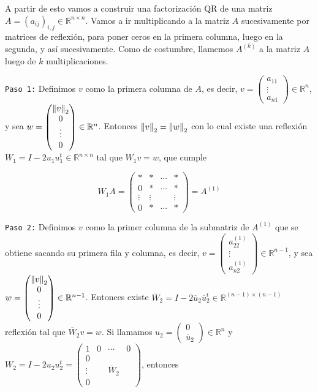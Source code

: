 A partir de esto vamos a construir una factorización QR de una matriz $A = (a_{ij})_{i, j} \in \mathbb{R}^{n \times n}$. Vamos a ir multiplicando a la matriz $A$ sucesivamente por matrices de reflexión, para poner ceros en la primera columna, luego en la segunda, y así sucesivamente. Como de costumbre, llamemos $A^{(k)}$ a la matriz $A$ luego de $k$ multiplicaciones.


\texttt{Paso 1:} Definimos $v$ como la primera columna de $A$, es decir, $v = \begin{pmatrix} a_{11} \\ \vdots \\ a_{n1} \end{pmatrix} \in \mathbb{R}^{n}$, y sea $w = \begin{pmatrix}\left\lVert v\right\rVert_2 \\ 0 \\ \vdots \\ 0 \end{pmatrix} \in \mathbb{R}^{n}$. Entonces $\left\lVert v\right\rVert_2 = \left\lVert w\right\rVert_2$ con lo cual existe una reflexión $W_1 = I - 2u_1u_1^t \in \mathbb{R}^{n \times n}$ tal que $W_1v = w$, que cumple

\[W_1 A = \begin{pmatrix}
* & * & \cdots & *\\
0 & * & \cdots & *\\
\vdots & \vdots & & \vdots \\
0 & * & \cdots & *
\end{pmatrix} = A^{(1)}\]

\texttt{Paso 2:} Definimos $v$ como la primer columna de la submatriz de $A^{(1)}$ que se obtiene sacando su primera fila y columna, es decir, $v = \begin{pmatrix}a^{(1)}_{22} \\ \vdots \\ a^{(1)}_{n2} \end{pmatrix} \in \mathbb{R}^{n - 1}$, y sea $w = \begin{pmatrix}\left\lVert v\right\rVert_2 \\ 0 \\ \vdots \\ 0 \end{pmatrix} \in \mathbb{R}^{n - 1}$. Entonces existe $\overline{W}_2 = I - 2\overline{u}_2\overline{u}_2^t \in \mathbb{R}^{(n - 1) \times (n - 1)}$ reflexión tal que $\overline{W}_2v = w$. Si llamamos $u_2 = \begin{pmatrix}0 \\ \overline{u}_2\end{pmatrix} \in \mathbb{R}^n$ y $W_2 = I - 2u_2u_2^t = \begin{pmatrix}1 & 0 & \cdots & 0 \\ 0 & &  & \\
\vdots & & \overline{W}_2 & \\ 0 & & &\end{pmatrix}$, entonces

